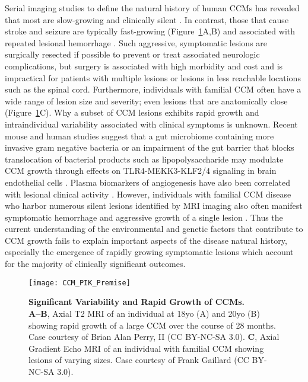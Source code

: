 Serial imaging studies to define the natural history of human CCMs has revealed that most are slow-growing and clinically silent \citep{akers2017, alshanisalman2012, horne2016}. In contrast, those that cause stroke and seizure are typically fast-growing (Figure~\ref{CCM_PIK_Premise}A,B) and associated with repeated lesional hemorrhage \citep{awad2019, porter1997}. Such aggressive, symptomatic lesions are surgically resected if possible to prevent or treat associated neurologic complications, but surgery is associated with high morbidity and cost and is impractical for patients with multiple lesions or lesions in less reachable locations such as the spinal cord. Furthermore, individuals with familial CCM often have a wide range of lesion size and severity; even lesions that are anatomically close (Figure~\ref{CCM_PIK_Premise}C). Why a subset of CCM lesions exhibits rapid growth and intraindividual variability associated with clinical symptoms is unknown. Recent mouse and human studies suggest that a gut microbiome containing more invasive gram negative bacteria or an impairment of the gut barrier that blocks translocation of bacterial products such as lipopolysaccharide may modulate CCM growth through effects on TLR4-MEKK3-KLF2/4 signaling in brain endothelial cells \citep{tang2019, tang2017, polster2020}. Plasma biomarkers of angiogenesis have also been correlated with lesional clinical activity \citep{girard2018, lyne2019}. However, individuals with familial CCM disease who harbor numerous silent lesions identified by MRI imaging also often manifest symptomatic hemorrhage and aggressive growth of a single lesion \citep{polster2019}. Thus the current understanding of the environmental and genetic factors that contribute to CCM growth fails to explain important aspects of the disease natural history, especially the emergence of rapidly growing symptomatic lesions which account for the majority of clinically significant outcomes.

\begin{figure}[tbp!]
\begin{center}
\texttt{[image: CCM\_PIK\_Premise]}
\end{center}
\caption[Significant Variability and Rapid Growth of CCMs.] {\textbf{Significant Variability and Rapid Growth of CCMs.} \\ \textbf{A--B},  Axial T2 MRI of an individual at 18yo (A) and 20yo (B) showing rapid growth of a large CCM over the course of 28 months. Case courtesy of Brian Alan Perry, II (CC BY-NC-SA 3.0). \textbf{C}, Axial Gradient Echo MRI of an individual with familial CCM showing lesions of varying sizes. Case courtesy of Frank Gaillard (CC BY-NC-SA 3.0).}


\label{CCM_PIK_Premise}
\end{figure}

